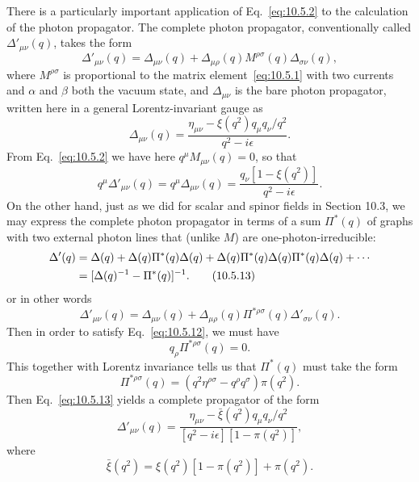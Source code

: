There is a particularly important application of Eq.~\eqref{eq:10.5.2} to the
calculation of the photon propagator. The complete photon propagator,
conventionally called $\Delta'_{\mu\nu}(q)$, takes the form
\begin{equation}
  \Delta'_{\mu\nu}(q)=\Delta_{\mu\nu}(q)
  +\Delta_{\mu\rho}(q)M^{\rho\sigma}(q)\Delta_{\sigma\nu}(q),
  \tag{10.5.10}\label{eq:10.5.10}
\end{equation}
where $M^{\rho\sigma}$ is proportional to the matrix element~\eqref{eq:10.5.1}
with two currents and $\alpha$ and $\beta$ both the vacuum state, and
$\Delta_{\mu\nu}$ is the bare photon propagator, written here in a general
Lorentz-invariant gauge as
\begin{equation}
  \Delta_{\mu\nu}(q)
  =\frac{\eta_{\mu\nu}-\xi(q^2)q_\mu q_\nu/q^2}{q^2-i\epsilon}.
  \tag{10.5.11}\label{eq:10.5.11}
\end{equation}
From Eq.~\eqref{eq:10.5.2} we have here $q^\mu M_{\mu\nu}(q)=0$, so that
\begin{equation}
  q^\mu\Delta'_{\mu\nu}(q)=q^\mu\Delta_{\mu\nu}(q)
  =\frac{q_\nu[1-\xi(q^2)]}{q^2-i\epsilon}.
  \tag{10.5.12}\label{eq:10.5.12}
\end{equation}
On the other hand, just as we did for scalar and spinor fields in Section
10.3, we may express the complete photon propagator in terms of a sum
$\Pi^*(q)$ of graphs with two external photon lines that (unlike $M$) are
one-photon-irreducible:
\begin{align}
  \Delta'(q)={}&\Delta(q)+\Delta(q)\Pi^*(q)\Delta(q)
  +\Delta(q)\Pi^*(q)\Delta(q)\Pi^*(q)\Delta(q)+\cdots \notag\\
  ={}&[\Delta(q)^{-1}-\Pi^*(q)]^{-1}.
  \tag{10.5.13}\label{eq:10.5.13}
\end{align}
or in other words
\begin{equation}
  \Delta'_{\mu\nu}(q)=\Delta_{\mu\nu}(q)
  +\Delta_{\mu\rho}(q)\Pi^{*\rho\sigma}(q)\Delta'_{\sigma\nu}(q).
  \tag{10.5.14}\label{eq:10.5.14}
\end{equation}
Then in order to satisfy Eq.~\eqref{eq:10.5.12}, we must have
\begin{equation}
  q_\rho\Pi^{*\rho\sigma}(q)=0.
  \tag{10.5.15}\label{eq:10.5.15}
\end{equation}
This together with Lorentz invariance tells us that $\Pi^*(q)$ must take the
form
\begin{equation}
  \Pi^{*\rho\sigma}(q)=(q^2\eta^{\rho\sigma}-q^\rho q^\sigma)\pi(q^2).
  \tag{10.5.16}\label{eq:10.5.16}
\end{equation}
Then Eq.~\eqref{eq:10.5.13} yields a complete propagator of the form
\begin{equation}
  \Delta'_{\mu\nu}(q)
  =\frac{\eta_{\mu\nu}-\bar\xi(q^2)q_\mu q_\nu/q^2}
  {[q^2-i\epsilon][1-\pi(q^2)]},
  \tag{10.5.17}\label{eq:10.5.17}
\end{equation}
where
\begin{equation}
  \bar\xi(q^2)=\xi(q^2)[1-\pi(q^2)]+\pi(q^2).
  \tag{10.5.18}\label{eq:10.5.18}
\end{equation}

